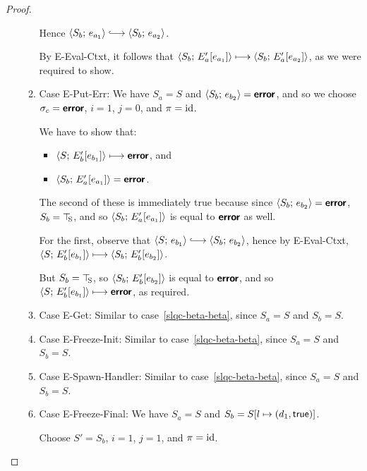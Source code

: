 \begin{proof}
\begin{enumerate}
\begin{enumerate}
      Hence $\config{S_b}{e_{a_1}} \parstepsto \config{S_b}{e_{a_2}}$.

      By {\sc E-Eval-Ctxt}, it follows that
      $\langle S_b;\, E'_a\hspace{-0.5mm}\left[e_{a_1}\right] \rangle \longmapsto
      \langle S_b;\, E'_a\hspace{-0.5mm}\left[e_{a_2}\right] \rangle$, as we were required to
      show.

    \item \label{slqc-beta-put-err}Case {\sc E-Put-Err}: We have $S_a
      = S$ and $\langle S_b;\, e_{b_2} \rangle = \textbf{\textsf{error}}$, and so we choose
      $\sigma_c = \textbf{\textsf{error}}$, $i = 1$, $j = 0$, and $\pi = \mathrm{id}$.

      We have to show that:
      \begin{itemize}
      \item $\langle S;\, E'_b\hspace{-0.5mm}\left[e_{b_1}\right] \rangle \longmapsto \textbf{\textsf{error}}$,
        and
      \item $\langle S_b;\, E'_a\hspace{-0.5mm}\left[e_{a_1}\right] \rangle = \textbf{\textsf{error}}$.
      \end{itemize}

      The second of these is immediately true because since
      $\langle S_b;\, e_{b_2} \rangle = \textbf{\textsf{error}}$, $S_b = \top\hspace{-0.85mm}_{\mathrm{S}}$, and so
      $\langle S_b;\, E'_a\hspace{-0.5mm}\left[e_{a_1}\right] \rangle$ is equal to $\textbf{\textsf{error}}$ as
      well.

      For the first, observe that $\config{S}{e_{b_1}} \parstepsto
      \config{S_b}{e_{b_2}}$, hence by {\sc E-Eval-Ctxt},
      $\langle S;\, E'_b\hspace{-0.5mm}\left[e_{b_1}\right] \rangle \longmapsto
      \langle S_b;\, E'_b\hspace{-0.5mm}\left[e_{b_2}\right] \rangle$.

      But $S_b = \top\hspace{-0.85mm}_{\mathrm{S}}$, so $\langle S_b;\, E'_b\hspace{-0.5mm}\left[e_{b_2}\right] \rangle$
      is equal to $\textbf{\textsf{error}}$, and so
      $\langle S;\, E'_b\hspace{-0.5mm}\left[e_{b_1}\right] \rangle \longmapsto \textbf{\textsf{error}}$, as
      required.

    \item \label{slqc-beta-get}Case {\sc E-Get}: Similar to
      case~\ref{slqc-beta-beta}, since $S_a = S$ and $S_b = S$.
    \item \label{slqc-beta-freeze-init}Case {\sc E-Freeze-Init}:
      Similar to case~\ref{slqc-beta-beta}, since $S_a = S$ and $S_b =
      S$.
    \item \label{slqc-beta-spawn-handler}Case {\sc E-Spawn-Handler}:
      Similar to case~\ref{slqc-beta-beta}, since $S_a = S$ and $S_b =
      S$.
    \item \label{slqc-beta-freeze-final}Case {\sc E-Freeze-Final}: We
      have $S_a = S$ and $S_b = S[l \mapsto (d_1, \textsf{true})]$.

      Choose $S' = S_b$, $i = 1$, $j = 1$, and $\pi = \mathrm{id}$.


\end{enumerate}
\end{enumerate}
\end{proof}
